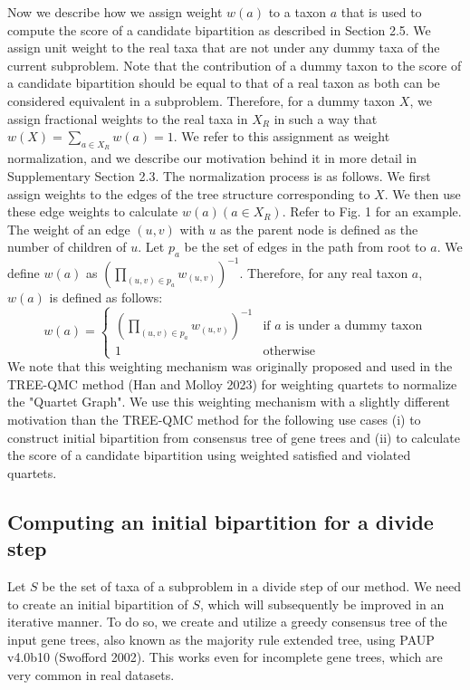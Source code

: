 \documentclass[11pt]{article}
\begin{document}
Now we describe how we assign weight $w(a)$ to a taxon $a$ that is used to compute the score of a candidate bipartition as described in Section 2.5. We assign unit weight to the real taxa that are not under any dummy taxa of the current subproblem. Note that the contribution of a dummy taxon to the score of a candidate bipartition should be equal to that of a real taxon as both can be considered equivalent in a subproblem. Therefore, for a dummy taxon $X$, we assign fractional weights to the real taxa in $X_R$ in such a way that $w(X) = \sum_{a \in X_R} w(a) = 1$. We refer to this assignment as weight normalization, and we describe our motivation behind it in more detail in Supplementary Section 2.3. The normalization process is as follows. We first assign weights to the edges of the tree structure corresponding to $X$. We then use these edge weights to calculate $w(a) (a \in X_R)$. Refer to Fig. 1 for an example. The weight of an edge $(u, v)$ with $u$ as the parent node is defined as the number of children of $u$. Let $p_a$ be the set of edges in the path from root to $a$. We define $w(a)$ as $\left( \prod_{(u,v) \in p_a} w_{(u,v)} \right)^{-1}$. Therefore, for any real taxon $a$, $w(a)$ is defined as follows:
\[
w(a) = \begin{cases}
\left( \prod_{(u,v) \in p_a} w_{(u,v)} \right)^{-1} & \text{if } a \text{ is under a dummy taxon} \\
1 & \text{otherwise}
\end{cases}
\]
We note that this weighting mechanism was originally proposed and used in the TREE-QMC method (Han and Molloy 2023) for weighting quartets to normalize the "Quartet Graph". We use this weighting mechanism with a slightly different motivation than the TREE-QMC method for the following use cases (i) to construct initial bipartition from consensus tree of gene trees and (ii) to calculate the score of a candidate bipartition using weighted satisfied and violated quartets.

\subsection*{Computing an initial bipartition for a divide step}

Let $S$ be the set of taxa of a subproblem in a divide step of our method. We need to create an initial bipartition of $S$, which will subsequently be improved in an iterative manner. To do so, we create and utilize a greedy consensus tree of the input gene trees, also known as the majority rule extended tree, using PAUP v4.0b10 (Swofford 2002). This works even for incomplete gene trees, which are very common in real datasets.
\end{document}
